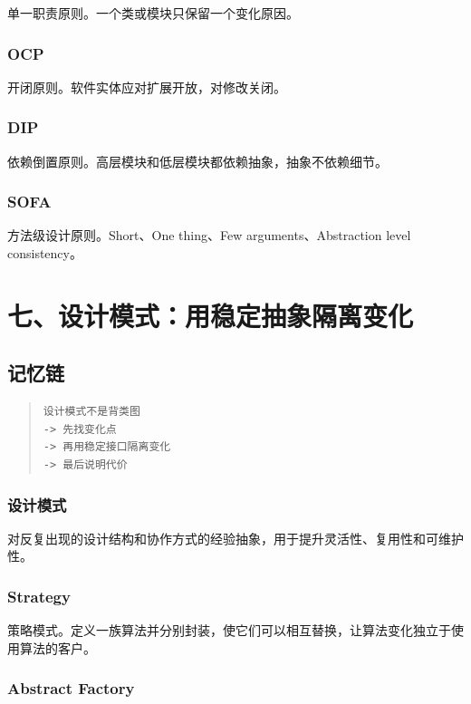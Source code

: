 \documentclass[UTF8,zihao=-4]{ctexart}
\begin{document}
单一职责原则。一个类或模块只保留一个变化原因。


\subsubsection*{OCP}


开闭原则。软件实体应对扩展开放，对修改关闭。


\subsubsection*{DIP}


依赖倒置原则。高层模块和低层模块都依赖抽象，抽象不依赖细节。


\subsubsection*{SOFA}


方法级设计原则。Short、One thing、Few arguments、Abstraction level consistency。


\section{七、设计模式：用稳定抽象隔离变化}


\subsection{记忆链}


\begin{quote}
\footnotesize
\begin{verbatim}
设计模式不是背类图
-> 先找变化点
-> 再用稳定接口隔离变化
-> 最后说明代价
\end{verbatim}
\end{quote}


\subsubsection*{设计模式}


对反复出现的设计结构和协作方式的经验抽象，用于提升灵活性、复用性和可维护性。


\subsubsection*{Strategy}


策略模式。定义一族算法并分别封装，使它们可以相互替换，让算法变化独立于使用算法的客户。


\subsubsection*{Abstract Factory}
\end{document}

